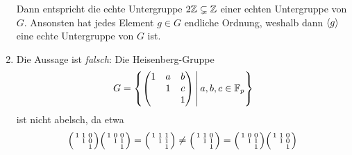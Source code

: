 \begin{solution}
\begin{enumerate}
      Dann entspricht die echte Untergruppe $2\mathbb{Z} \subsetneq \mathbb{Z}$ einer echten Untergruppe von $G$.
      Ansonsten hat jedes Element $g \in G$ endliche Ordnung, weshalb dann $\langle g\rangle$ eine echte Untergruppe von $G$ ist.
    \item
      Die Aussage ist \emph{falsch}:
      Die Heisenberg-Gruppe
      \[
          G
        = \left\{
            \begin{pmatrix}
              1 & a & b \\
                & 1 & c \\
                &   & 1
            \end{pmatrix}
          \,\middle|\,
            a, b, c \in \mathbb{F}_p
          \right\}
      \]
      ist nicht abelsch, da etwa
      \[
              \begin{psmallmatrix}
                1 & 1 & 0 \\
                  & 1 & 0 \\
                  &   & 1
              \end{psmallmatrix}
              \begin{psmallmatrix}
                1 & 0 & 0 \\
                  & 1 & 1 \\
                  &   & 1
              \end{psmallmatrix}
        =     \begin{psmallmatrix}
                1 & 1 & 1 \\
                  & 1 & 1 \\
                  &   & 1
              \end{psmallmatrix}
        \neq  \begin{psmallmatrix}
                1 & 1 & 0 \\
                  & 1 & 1 \\
                  &   & 1
              \end{psmallmatrix}
        =     \begin{psmallmatrix}
                1 & 0 & 0 \\
                  & 1 & 1 \\
                  &   & 1
              \end{psmallmatrix}
              \begin{psmallmatrix}
                1 & 1 & 0 \\
                  & 1 & 0 \\
                  &   & 1

\end{psmallmatrix}\]
\end{enumerate}
\end{solution}
